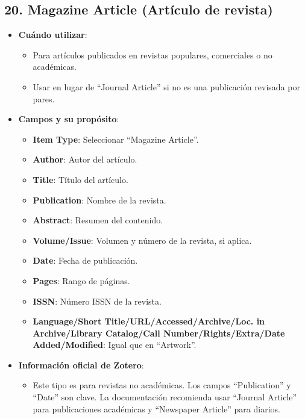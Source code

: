 \documentclass[
  jou,
  floatsintext,
  longtable,
  a4paper,
  nolmodern,
  notxfonts,
  notimes,
  colorlinks=true,linkcolor=blue,citecolor=blue,urlcolor=blue]{apa7}
\providecommand{\tightlist}{%
  \setlength{\itemsep}{0pt}\setlength{\parskip}{0pt}}
\begin{document}
\subsection{20. Magazine Article (Artículo de
revista)}\label{magazine-article-artuxedculo-de-revista}

\begin{itemize}
\tightlist
\item
  \textbf{Cuándo utilizar}:

  \begin{itemize}
  \tightlist
  \item
    Para artículos publicados en revistas populares, comerciales o no
    académicas.
  \item
    Usar en lugar de ``Journal Article'' si no es una publicación
    revisada por pares.
  \end{itemize}
\item
  \textbf{Campos y su propósito}:

  \begin{itemize}
  \tightlist
  \item
    \textbf{Item Type}: Seleccionar ``Magazine Article''.
  \item
    \textbf{Author}: Autor del artículo.
  \item
    \textbf{Title}: Título del artículo.
  \item
    \textbf{Publication}: Nombre de la revista.
  \item
    \textbf{Abstract}: Resumen del contenido.
  \item
    \textbf{Volume/Issue}: Volumen y número de la revista, si aplica.
  \item
    \textbf{Date}: Fecha de publicación.
  \item
    \textbf{Pages}: Rango de páginas.
  \item
    \textbf{ISSN}: Número ISSN de la revista.
  \item
    \textbf{Language/Short Title/URL/Accessed/Archive/Loc. in
    Archive/Library Catalog/Call Number/Rights/Extra/Date
    Added/Modified}: Igual que en ``Artwork''.
  \end{itemize}
\item
  \textbf{Información oficial de Zotero}:

  \begin{itemize}
  \tightlist
  \item
    Este tipo es para revistas no académicas. Los campos ``Publication''
    y ``Date'' son clave. La documentación recomienda usar ``Journal
    Article'' para publicaciones académicas y ``Newspaper Article'' para
    diarios.
  \end{itemize}
\end{itemize}
\end{document}
